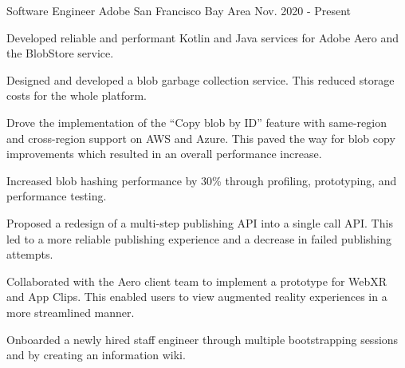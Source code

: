


\begin{cventries}


\cventry
{Software Engineer} %
{Adobe} %
{San Francisco Bay Area} %
{Nov. 2020 - Present} %
{ %
\begin{cvitems}
\item {Developed reliable and performant Kotlin and Java services for Adobe Aero and the BlobStore service.}
\item {Designed and developed a blob garbage collection service. This reduced storage costs for the whole platform.}
\item {Drove the implementation of the ``Copy blob by ID'' feature with same-region and cross-region support on AWS and Azure. This paved the way for blob copy improvements which resulted in an overall performance increase.}
\item {Increased blob hashing performance by 30\% through profiling, prototyping, and performance testing.}
\item {Proposed a redesign of a multi-step publishing API into a single call API. This led to a more reliable publishing experience and a decrease in failed publishing attempts.}
\item {Collaborated with the Aero client team to implement a prototype for WebXR and App Clips. This enabled users to view augmented reality experiences in a more streamlined manner.}
\item {Onboarded a newly hired staff engineer through multiple bootstrapping sessions and by creating an information wiki.}
\end{cvitems}
}



\end{cventries}
